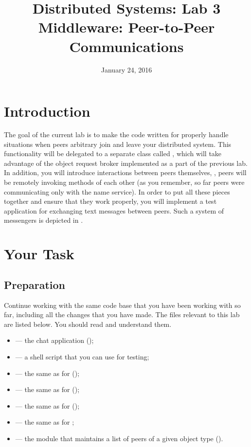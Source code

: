 \documentclass[a4paper]{article}
\title{Distributed Systems: Lab 3\\Middleware: Peer-to-Peer
Communications}
\author{}
\date{January 24, 2016}
\begin{document}
\maketitle

\section{Introduction}

The goal of the current lab is to make the code written for  properly
handle situations when peers arbitrary join and leave your distributed system.
This functionality will be delegated to a separate class called
, which will take advantage of the object request broker
implemented as a part of the previous lab. In addition, you will introduce
interactions between peers themselves, \ie, peers will be remotely invoking
methods \cite{lecture3} of each other (as you remember, so far peers were
communicating only with the name service). In order to put all these pieces
together and ensure that they work properly, you will implement a test
application for exchanging text messages between peers. Such a system of
messengers is depicted in .

\section{Your Task}
\subsection{Preparation}
Continue working with the same code base that you have been working with so far,
including all the changes that you have made. The files relevant to this lab are
listed below. You should read and understand them.
\begin{itemize}

  \item {} --- the chat application (\leave);

  \item {} --- a shell script that you can use for testing;

  \item {} --- the same as for
   (\leave);

  \item {} --- the same as for 
  (\overwrite);

  \item {} --- the same as for 
  (\overwrite);

  \item {} --- the same as for ;

  \item {} --- the module that maintains a
  list of peers of a given object type (\fix).

\end{itemize}
\end{document}
